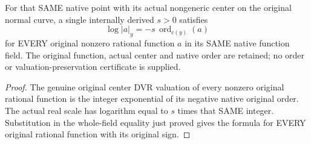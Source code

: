 \begin{lemma}
\label{lem:actual-generic-curve-center-order-logarithm}
\leanok
For that SAME native point with its actual nongeneric center on the original
normal curve, a single internally derived $s>0$ satisfies
\[
 \log |a|_y=-s\,\operatorname{ord}_{c(y)}(a)
\]
for EVERY original nonzero rational function $a$ in its SAME native function
field. The original function, actual center and native order are retained;
no order or valuation-preservation certificate is supplied.
\end{lemma}
\begin{proof}
The genuine original center DVR valuation of every nonzero original rational
function is the integer exponential of its negative native original order.
The actual real scale has logarithm equal to $s$ times that SAME integer.
Substitution in the whole-field equality just proved gives the formula for
EVERY original rational function with its original sign.
\end{proof}
